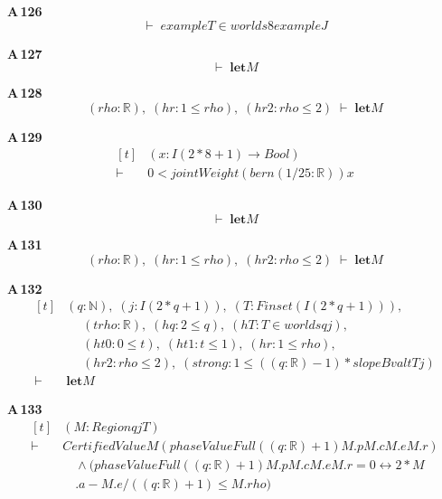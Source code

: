 \noindent\textbf{A\,126}\quad{}
{\footnotesize\[ \vdash\; \mathit{exampleT} \in \mathit{worlds} 8 \mathit{exampleJ} \]}

\noindent\textbf{A\,127}\quad{}
{\footnotesize\[ \vdash\; \mathbf{let} \mathit{M} \]}

\noindent\textbf{A\,128}\quad{}
{\footnotesize\[ (\mathit{rho} : \mathbb{R} ),\; (\mathit{hr} : 1 \leq \mathit{rho}),\; (\mathit{hr2} : \mathit{rho} \leq 2) \;\vdash\; \mathbf{let} \mathit{M} \]}

\noindent\textbf{A\,129}\quad{}
{\footnotesize\[ \begin{aligned}[t]
&(\mathit{x} : \mathit{I} (2*8+1) \to \mathit{Bool})\\
\vdash\;&0 < \mathit{jointWeight} (\mathit{bern} (1/25 : \mathbb{R} )) \mathit{x}
\end{aligned} \]}

\noindent\textbf{A\,130}\quad{}
{\footnotesize\[ \vdash\; \mathbf{let} \mathit{M} \]}

\noindent\textbf{A\,131}\quad{}
{\footnotesize\[ (\mathit{rho} : \mathbb{R} ),\; (\mathit{hr} : 1 \leq \mathit{rho}),\; (\mathit{hr2} : \mathit{rho} \leq 2) \;\vdash\; \mathbf{let} \mathit{M} \]}

\noindent\textbf{A\,132}\quad{}
{\footnotesize\[ \begin{aligned}[t]
&(\mathit{q} : \mathbb{N} ),\; (\mathit{j} : \mathit{I} (2*\mathit{q}+1)),\; (\mathit{T} : \mathit{Finset} (\mathit{I} (2*\mathit{q}+1))),\\
&\quad \; (\mathit{t} \mathit{rho} : \mathbb{R} ),\; (\mathit{hq} : 2 \leq \mathit{q}),\; (\mathit{hT} : \mathit{T} \in \mathit{worlds} \mathit{q} \mathit{j}),\\
&\quad \; (\mathit{ht0} : 0 \leq \mathit{t}),\; (\mathit{ht1} : \mathit{t} \leq 1),\; (\mathit{hr} : 1 \leq \mathit{rho}),\\
&\quad \; (\mathit{hr2} : \mathit{rho} \leq 2),\; (\mathit{strong} : 1 \leq ((\mathit{q}:\mathbb{R} )-1)*\mathit{slopeBval} \mathit{t} \mathit{T} \mathit{j})\\
\vdash\;&\mathbf{let} \mathit{M}
\end{aligned} \]}

\noindent\textbf{A\,133}\quad{}
{\footnotesize\[ \begin{aligned}[t]
&(\mathit{M} : \mathit{Region} \mathit{q} \mathit{j} \mathit{T})\\
\vdash\;&\mathit{CertifiedValue} \mathit{M} (\mathit{phaseValueFull} ((\mathit{q}:\mathbb{R} )+1) \mathit{M}.\mathit{p} \mathit{M}.\mathit{c} \mathit{M}.\mathit{e} \mathit{M}.\mathit{r})\\
&\quad \wedge (\mathit{phaseValueFull} ((\mathit{q}:\mathbb{R} )+1) \mathit{M}.\mathit{p} \mathit{M}.\mathit{c} \mathit{M}.\mathit{e} \mathit{M}.\mathit{r} = 0 \leftrightarrow 2*\mathit{M}\\
&\quad .\mathit{a}-\mathit{M}.\mathit{e}/((\mathit{q}:\mathbb{R} )+1) \leq \mathit{M}.\mathit{rho})
\end{aligned} \]}

